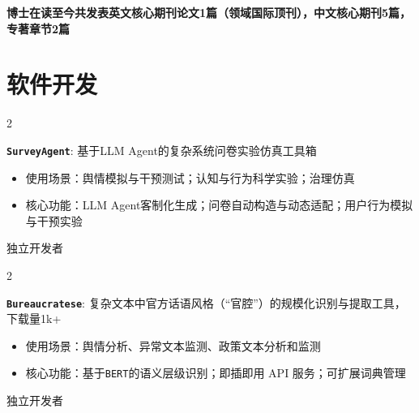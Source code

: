 \documentclass[10pt, letterpaper]{article}
\newenvironment{twocolentry}[2][]{
    \onecolentry
    \def\secondColumn{#2}
    \setcolumnwidth{\fill, 2.5 cm}
    \begin{paracol}{2}
}{
    \switchcolumn \raggedleft \secondColumn
    \end{paracol}
    \endonecolentry
} %
\begin{document}
    \textbf{博士在读至今共发表英文核心期刊论文1篇（领域国际顶刊），中文核心期刊5篇，专著章节2篇}

    \section{软件开发}

        \begin{twocolentry}{
            独立开发者

        }
        \textbf{\texttt{SurveyAgent}}:
        基于LLM Agent的复杂系统问卷实验仿真工具箱

        \begin{itemize}[
            topsep=0.005cm,   %
            parsep=0.005cm,   %
            partopsep=0pt,    %
            itemsep=0pt,      %
            leftmargin=0cm + 10pt
        ]
        \item 使用场景：舆情模拟与干预测试；认知与行为科学实验；治理仿真

        \item 核心功能：LLM Agent客制化生成；问卷自动构造与动态适配；用户行为模拟与干预实验

        \end{itemize}
        \end{twocolentry}

        \begin{twocolentry}{
            独立开发者
        }
        \textbf{\texttt{Bureaucratese}}:
        复杂文本中官方话语风格（“官腔”）的规模化识别与提取工具，下载量1k+

        \begin{itemize}[
            topsep=0.005cm,   %
            parsep=0.005cm,   %
            partopsep=0pt,    %
            itemsep=0pt,      %
            leftmargin=0cm + 10pt
        ]
        \item 使用场景：舆情分析、异常文本监测、政策文本分析和监测
        \item 核心功能：基于\texttt{BERT}的语义层级识别；即插即用 API 服务；可扩展词典管理

        \end{itemize}
        \end{twocolentry}
\end{document}
